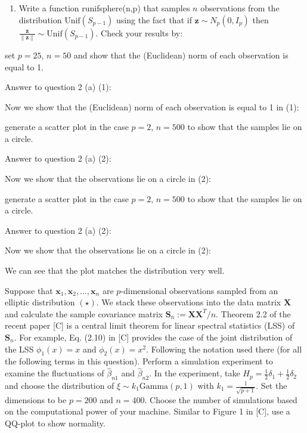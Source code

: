 \documentclass[
]{article}
\providecommand{\tightlist}{%
  \setlength{\itemsep}{0pt}\setlength{\parskip}{0pt}}
\begin{document}
\begin{enumerate}
\def\labelenumi{(\alph{enumi})}
\tightlist
\item
  Write a function runifsphere(n,p) that samples \(n\) observations from
  the distribution \(\text{Unif}(S_{p-1})\) using the fact that if
  \(\mathbf{z} \sim N_p(0, I_p)\) then
  \(\frac{\mathbf{z}}{\| \mathbf{z} \|} \sim \text{Unif}(S_{p-1})\).
  Check your results by:
\end{enumerate}

set \(p = 25\), \(n = 50\) and show that the (Euclidean) norm of each
observation is equal to 1.

Answer to question 2 (a) (1):

Now we show that the (Euclidean) norm of each observation is equal to 1
in (1):

generate a scatter plot in the case \(p = 2\), \(n = 500\) to show that
the samples lie on a circle.

Answer to question 2 (a) (2):

Now we show that the observations lie on a circle in (2):

generate a scatter plot in the case \(p = 2\), \(n = 500\) to show that
the samples lie on a circle.

Answer to question 2 (a) (2):

Now we show that the observations lie on a circle in (2):

We can see that the plot matches the distribution very well.

Suppose that \(\mathbf{x}_1, \mathbf{x}_2, \dots, \mathbf{x}_n\) are
\(p\)-dimensional observations sampled from an elliptic distribution
\((\star)\). We stack these observations into the data matrix
\(\mathbf{X}\) and calculate the sample covariance matrix
\(\mathbf{S}_n := \mathbf{X} \mathbf{X}^T / n\). Theorem 2.2 of the
recent paper {[}C{]} is a central limit theorem for linear spectral
statistics (LSS) of \(\mathbf{S}_n\). For example, Eq. (2.10) in {[}C{]}
provides the case of the joint distribution of the LSS \(\phi_1(x) = x\)
and \(\phi_2(x) = x^2\). Following the notation used there (for all the
following terms in this question). Perform a simulation experiment to
examine the fluctuations of \(\hat{\beta}_{n1}\) and
\(\hat{\beta}_{n2}\). In the experiment, take
\(H_p = \frac{1}{2} \delta_1 + \frac{1}{2} \delta_2\) and choose the
distribution of \(\xi \sim k_1 \text{Gamma}(p, 1)\) with
\(k_1 = \frac{1}{\sqrt{p + 1}}\). Set the dimensions to be \(p = 200\)
and \(n = 400\). Choose the number of simulations based on the
computational power of your machine. Similar to Figure 1 in {[}C{]}, use
a QQ-plot to show normality.
\end{document}
